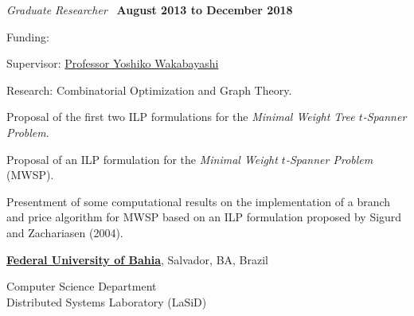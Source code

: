 \documentclass[10pt]{article}
\let\oldcite=\cite
\renewcommand{\cite}[1]{\footnotesize{\textbf{\oldcite{#1}}}\normalsize{}}
\newcommand{\halfblankline}{\quad\vspace{-0.5\baselineskip}\pagebreak[3]}
\begin{document}
\begin{outerlist}

\item[] \textit{Graduate Researcher}~\cite{Braga2017,Braga2018}%
  \hfill \textbf{August 2013 to December 2018}
  \begin{innerlist}
    
  \item Funding:~\cite{Grant2014}
  \item Supervisor: \href{http://www.ime.usp.br/~yw}%
    {Professor Yoshiko Wakabayashi}
  \item Research: Combinatorial Optimization and Graph Theory.
  \item Proposal of the first two ILP formulations for the \emph{Minimal Weight Tree $t$-Spanner Problem}.
  \item Proposal of an ILP formulation for the \emph{Minimal Weight $t$-Spanner Problem} (MWSP).
  \item Presentment of some computational results on the implementation of a branch and price algorithm for MWSP based on an ILP formulation proposed by Sigurd and Zachariasen (2004).  

  \end{innerlist}

\end{outerlist}

\halfblankline

\href{http://www.ufba.br}{\textbf{Federal University of Bahia}},
Salvador, BA, Brazil

\begin{innerlist}
  \item[]
    Computer Science Department\\
    Distributed Systems Laboratory (LaSiD)
\end{innerlist}
\end{document}
